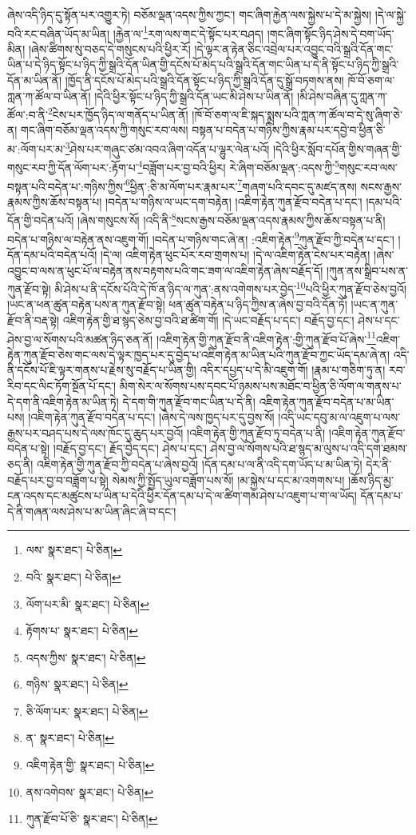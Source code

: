 ཞེས་འདི་ཉིད་དུ་སྟོན་པར་འགྱུར་ཏེ། བཅོམ་ལྡན་འདས་ཀྱིས་ཀྱང་། གང་ཞིག་རྐྱེན་ལས་སྐྱེས་པ་དེ་མ་སྐྱེས། །དེ་ལ་སྐྱེ་བའི་རང་བཞིན་ཡོད་མ་ཡིན། །རྐྱེན་ལ་\footnote{ལས་  སྣར་ཐང་།  པེ་ཅིན། }རག་ལས་གང་དེ་སྟོང་པར་བཤད། །གང་ཞིག་སྟོང་ཉིད་ཤེས་དེ་བག་ཡོད་མིན། །ཞེས་ཚིགས་སུ་བཅད་དེ་གསུངས་པའི་ཕྱིར་རོ། །དེ་ལྟར་ན་རྟེན་ཅིང་འབྲེལ་པར་འབྱུང་བའི་སྒྲའི་དོན་གང་ཡིན་པ་དེ་ཉིད་སྟོང་པ་ཉིད་ཀྱི་སྒྲའི་དོན་ཡིན་གྱི་དངོས་པོ་མེད་པའི་སྒྲའི་དོན་གང་ཡིན་པ་དེ་ནི་སྟོང་པ་ཉིད་ཀྱི་སྒྲའི་དོན་མ་ཡིན་ནོ། །ཁྱོད་ནི་དངོས་པོ་མེད་པའི་སྒྲའི་དོན་སྟོང་པ་ཉིད་ཀྱི་སྒྲའི་དོན་དུ་སྒྲོ་བཏགས་ནས། ཁོ་བོ་ཅག་ལ་ཀླན་ཀ་ཚོལ་བ་ཡིན་ནོ། །དེའི་ཕྱིར་སྟོང་པ་ཉིད་ཀྱི་སྒྲའི་དོན་ཡང་མི་ཤེས་པ་ཡིན་ནོ། །མི་ཤེས་བཞིན་དུ་ཀླན་ཀ་ཚོལ་:བ་ནི་\footnote{བའི་  སྣར་ཐང་།  པེ་ཅིན། }ངེས་པར་ཁྱོད་ཉིད་ལ་གནོད་པ་ཡིན་ནོ། །ཁོ་བོ་ཅག་ལ་ཇི་སྐད་སྨྲས་པའི་ཀླན་ཀ་ཚོལ་བ་དེ་སུ་ཞིག་ཅེ་ན། གང་ཞིག་བཅོམ་ལྡན་འདས་ཀྱི་གསུང་རབ་ལས། བསྟན་པ་བདེན་པ་གཉིས་ཀྱིས་རྣམ་པར་དབྱེ་བ་ཕྱིན་ཅི་མ་:ལོག་པར་མ་\footnote{ལོག་པར་མི་  སྣར་ཐང་།  པེ་ཅིན། }ཤེས་པར་གཞུང་ཙམ་འབའ་ཞིག་འདོན་པ་ལྷུར་ལེན་པའོ། །དེའི་ཕྱིར་སློབ་དཔོན་གྱིས་གཞན་གྱི་གསུང་རབ་ཀྱི་དོན་ལོག་པར་:རྟོག་པ་\footnote{རྟོགས་པ་  སྣར་ཐང་།  པེ་ཅིན། }བཟློག་པར་བྱ་བའི་ཕྱིར། རེ་ཞིག་བཅོམ་ལྡན་:འདས་ཀྱི་\footnote{འདས་ཀྱིས་  སྣར་ཐང་།  པེ་ཅིན། }གསུང་རབ་ལས་བསྟན་པའི་བདེན་པ་:གཉིས་ཀྱིས་\footnote{གཉིས་  སྣར་ཐང་།  པེ་ཅིན། }ཕྱིན་:ཅི་མ་ལོག་པར་རྣམ་པར་\footnote{ཅི་ལོག་པར་  སྣར་ཐང་།  པེ་ཅིན། }གཞག་པའི་དབང་དུ་མཛད་ནས། སངས་རྒྱས་རྣམས་ཀྱིས་ཆོས་བསྟན་པ། །བདེན་པ་གཉིས་ལ་ཡང་དག་བརྟེན། །འཇིག་རྟེན་ཀུན་རྫོབ་བདེན་པ་དང་། །དམ་པའི་དོན་གྱི་བདེན་པའོ། །ཞེས་གསུངས་སོ། །འདི་ནི་\footnote{ན་  སྣར་ཐང་།  པེ་ཅིན། }སངས་རྒྱས་བཅོམ་ལྡན་འདས་རྣམས་ཀྱིས་ཆོས་བསྟན་པ་ནི། བདེན་པ་གཉིས་ལ་བརྟེན་ནས་འཇུག་གོ། །བདེན་པ་གཉིས་གང་ཞེ་ན། :འཇིག་རྟེན་\footnote{འཇིག་རྟེན་གྱི་  སྣར་ཐང་།  པེ་ཅིན། }ཀུན་རྫོབ་ཀྱི་བདེན་པ་དང་། །དོན་དམ་པའི་བདེན་པའོ། །དེ་ལ། འཇིག་རྟེན་ཕུང་པོར་རབ་གྲགས་པ། །དེ་ལ་འཇིག་རྟེན་ངེས་པར་བརྟེན། །ཞེས་འབྱུང་བ་ལས་ན་ཕུང་པོ་ལ་བརྟེན་ནས་བརྟགས་པའི་གང་ཟག་ལ་འཇིག་རྟེན་ཞེས་བརྗོད་དོ། །ཀུན་ནས་སྒྲིབ་པས་ན་ཀུན་རྫོབ་སྟེ། མི་ཤེས་པ་ནི་དངོས་པོའི་དེ་ཁོ་ན་ཉིད་ལ་ཀུན་:ནས་འགེགས་པར་བྱེད་\footnote{ནས་འགེབས་  སྣར་ཐང་།  པེ་ཅིན། }པའི་ཕྱིར་ཀུན་རྫོབ་ཅེས་བྱའོ། །ཡང་ན་ཕན་ཚུན་བརྟེན་པས་ན་ཀུན་རྫོབ་སྟེ། ཕན་ཚུན་བརྟེན་པ་ཉིད་ཀྱིས་ན་ཞེས་བྱ་བའི་དོན་ཏོ། །ཡང་ན་ཀུན་རྫོབ་ནི་བརྡ་སྟེ། འཇིག་རྟེན་གྱི་ཐ་སྙད་ཅེས་བྱ་བའི་ཐ་ཚིག་གོ། །དེ་ཡང་བརྗོད་པ་དང་། བརྗོད་བྱ་དང་། ཤེས་པ་དང་ཤེས་བྱ་ལ་སོགས་པའི་མཚན་ཉིད་ཅན་ནོ། །འཇིག་རྟེན་གྱི་ཀུན་རྫོབ་ནི་འཇིག་རྟེན་:གྱི་ཀུན་རྫོབ་པོ་ཞེས་\footnote{ཀུན་རྫོབ་པོ་ཅི་  སྣར་ཐང་།  པེ་ཅིན། }འཇིག་རྟེན་ཀུན་རྫོབ་ཅེས་གང་ལས་དེ་ལྟར་ཁྱད་པར་དུ་བྱེད་པ་འཇིག་རྟེན་མ་ཡིན་པའི་ཀུན་རྫོབ་ཀྱང་ཡོད་དམ་ཞེ་ན། འདི་ནི་དངོས་པོ་ཇི་ལྟར་གནས་པ་རྗེས་སུ་བརྗོད་པ་ཡིན་གྱི། འདིར་དཔྱད་པ་དེ་མི་འཇུག་གོ། །རྣམ་པ་གཅིག་ཏུ་ན། རབ་རིབ་དང་ལིང་ཏོག་སྔོན་པོ་དང་། མིག་སེར་ལ་སོགས་པས་དབང་པོ་ཉམས་པས་མཐོང་བ་ཕྱིན་ཅི་ལོག་ལ་གནས་པ་དེ་དག་ནི་འཇིག་རྟེན་མ་ཡིན་ཏེ། དེ་དག་གི་ཀུན་རྫོབ་གང་ཡིན་པ་དེ་ནི། འཇིག་རྟེན་ཀུན་རྫོབ་བདེན་པ་མ་ཡིན་པས། །འཇིག་རྟེན་ཀུན་རྫོབ་བདེན་པ་དང་། །ཞེས་དེ་ལས་ཁྱད་པར་དུ་བྱས་སོ། །འདི་ཡང་དབུ་མ་ལ་འཇུག་པ་ལས་རྒྱས་པར་བཤད་པས་དེ་ལས་ཁོང་དུ་ཆུད་པར་བྱའོ། །འཇིག་རྟེན་གྱི་ཀུན་རྫོབ་ཏུ་བདེན་པ་ནི། །འཇིག་རྟེན་ཀུན་རྫོབ་བདེན་པ་སྟེ། །བརྗོད་བྱ་དང་། རྗོད་བྱེད་དང་། ཤེས་པ་དང་། ཤེས་བྱ་ལ་སོགས་པའི་ཐ་སྙད་མ་ལུས་པ་འདི་དག་ཐམས་ཅད་ནི། འཇིག་རྟེན་གྱི་ཀུན་རྫོབ་ཀྱི་བདེན་པ་ཞེས་བྱའོ། །དོན་དམ་པ་ལ་ནི་འདི་དག་ཡོད་པ་མ་ཡིན་ཏེ། དེར་ནི་བརྗོད་པར་བྱ་བ་བཟློག་པ་སྟེ། སེམས་ཀྱི་སྤྱོད་ཡུལ་བཟློག་པས་སོ། །མ་སྐྱེས་པ་དང་མ་འགགས་པ། །ཆོས་ཉིད་མྱ་ངན་འདས་དང་མཚུངས་པ་ཡིན་པ་དེའི་ཕྱིར་དོན་དམ་པ་དེ་ལ་ཚིག་གམ་ཤེས་པ་འཇུག་པ་ག་ལ་ཡོད། དོན་དམ་པ་དེ་ནི་གཞན་ལས་ཤེས་པ་མ་ཡིན་ཞིང་ཞི་བ་དང་། 